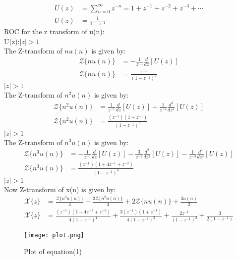 \documentclass{article}
\begin{document}
\begin{align}
U(z) &= \sum_{n=0}^{\infty} z^{-n} = 1 + z^{-1} + z^{-2} + z^{-3} + \dotsb  \\
U(z) &= \frac{1}{1- z^{-1}}
\end{align}
ROC for the z transform of u(n):\\
 U(z):$\lvert z \rvert > 1$\\
The Z-transform of $nu(n)$ is given by:
\begin{align}
\mathcal{Z}\{nu(n)\} &= -\frac{1}{z^{-1}} \frac{d}{dz}[U(z)]\\
\mathcal{Z}\{nu(n)\} &= \frac{z^{-1}}{(1 - z^{-1})^2}
\end{align}
 $\lvert z \rvert > 1$\\
The Z-transform of $n^2u(n)$ is given by:
\begin{align}
\mathcal{Z}\{n^2u(n)\} &= \frac{1}{z^{-1}} \frac{d}{dz}[U(z)] + \frac{1}{z^{-2}} \frac{d^2}{dz^2}[U(z)]\\
\mathcal{Z}\{n^2u(n)\} &= \frac{(z^{-1})(1+z^{-1})}{(1-z^{-1})^3}
\end{align}
 $\lvert z \rvert > 1$\\
The Z-transform of $n^3u(n)$ is given by:
\begin{align}
\mathcal{Z}\{n^3u(n)\} &= -\frac{1}{z^{-1}} \frac{d}{dz}[U(z)] - \frac{3}{z^{-2}} \frac{d^2}{dz^2}[U(z)] - \frac{1}{z^{-3}} \frac{d^3}{dz^3}[U(z)]\\
\mathcal{Z}\{n^3u(n)\} &= \frac{(z^{-1})(1+4z^{-1}+z^{-2})}{(1-z^{-1})^4}
\end{align}
 $\lvert z \rvert > 1$\\
Now Z-transform of x(n) is given by:
\begin{align}
\mathcal{X}\{z\} &=\frac{\mathcal{Z}\{n^3u(n)\}}{4} +\frac{3\mathcal{Z}\{n^2u(n)\}}{4} +2\mathcal{Z}\{nu(n)\} +\frac{3u(n)}{2}\\
\mathcal{X}\{z\} &=\frac{(z^{-1})(1+4z^{-1}+z^{-2})}{4(1-z^{-1})^4} +\frac{3(z^{-1})(1+z^{-1})}{4(1-z^{-1})^3} +\frac{2z^{-1}}{(1 - z^{-1})^2} +\frac{3}{2(1- z^{-1})}
\end{align}
\newpage


\begin{figure}
    \centering
    \texttt{[image: plot.png]}
    \caption{Plot of equation(1)}
    \label{fig:plot}
\end{figure}
\end{document}

